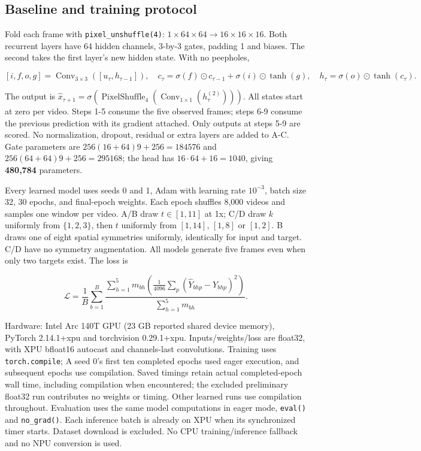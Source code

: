 \documentclass[
  10pt,
  a4paper,
]{article}
\begin{document}
\subsection{Baseline and training
protocol}\label{baseline-and-training-protocol}

Fold each frame with \texttt{pixel\_unshuffle(4)}:
\(1\times64\times64\to16\times16\times16\). Both recurrent layers have
64 hidden channels, 3-by-3 gates, padding 1 and biases. The second takes
the first layer's new hidden state. With no peepholes,

\[[i,f,o,g]=\operatorname{Conv}_{3\times3}([u_\tau,h_{\tau-1}]),\quad c_\tau=\sigma(f)\odot c_{\tau-1}+\sigma(i)\odot\tanh(g),\quad h_\tau=\sigma(o)\odot\tanh(c_\tau).\]

The output is
\(\widehat x_{\tau+1}=\sigma(\operatorname{PixelShuffle}_4(\operatorname{Conv}_{1\times1}(h^{(2)}_\tau)))\).
All states start at zero per video. Steps 1-5 consume the five observed
frames; steps 6-9 consume the previous prediction with its gradient
attached. Only outputs at steps 5-9 are scored. No normalization,
dropout, residual or extra layers are added to A-C. Gate parameters are
\(256(16+64)9+256=184576\) and \(256(64+64)9+256=295168\); the head has
\(16\cdot64+16=1040\), giving \textbf{480,784} parameters.

Every learned model uses seeds 0 and 1, Adam with learning rate
\(10^{-3}\), batch size 32, 30 epochs, and final-epoch weights. Each
epoch shuffles 8,000 videos and samples one window per video. A/B draw
\(t\in[1,11]\) at 1x; C/D draw \(k\) uniformly from \(\{1,2,3\}\), then
\(t\) uniformly from \([1,14]\), \([1,8]\) or \([1,2]\). B draws one of
eight spatial symmetries uniformly, identically for input and target.
C/D have no symmetry augmentation. All models generate five frames even
when only two targets exist. The loss is

\[\mathcal L=\frac1B\sum_{b=1}^B\frac{\sum_{h=1}^5m_{bh}\left(\frac1{4096}\sum_p(\widehat Y_{bhp}-Y_{bhp})^2\right)}{\sum_{h=1}^5m_{bh}}.\]

Hardware: Intel Arc 140T GPU (23 GB reported shared device memory),
PyTorch 2.14.1+xpu and torchvision 0.29.1+xpu. Inputs/weights/loss are
float32, with XPU bfloat16 autocast and channels-last convolutions.
Training uses \texttt{torch.compile}; A seed 0's first ten completed
epochs used eager execution, and subsequent epochs use compilation.
Saved timings retain actual completed-epoch wall time, including
compilation when encountered; the excluded preliminary float32 run
contributes no weights or timing. Other learned runs use compilation
throughout. Evaluation uses the same model computations in eager mode,
\texttt{eval()} and \texttt{no\_grad()}. Each inference batch is already
on XPU when its synchronized timer starts. Dataset download is excluded.
No CPU training/inference fallback and no NPU conversion is used.
\end{document}
